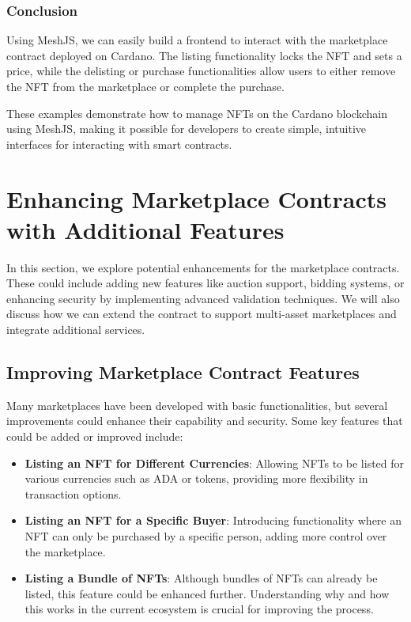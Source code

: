 \subsubsection{Conclusion}

Using MeshJS, we can easily build a frontend to interact with the marketplace contract deployed on Cardano. The listing functionality locks the NFT and sets a price, while the delisting or purchase functionalities allow users to either remove the NFT from the marketplace or complete the purchase.

These examples demonstrate how to manage NFTs on the Cardano blockchain using MeshJS, making it possible for developers to create simple, intuitive interfaces for interacting with smart contracts.


\section{Enhancing Marketplace Contracts with Additional Features}

In this section, we explore potential enhancements for the marketplace contracts. These could include adding new features like auction support, bidding systems, or enhancing security by implementing advanced validation techniques. We will also discuss how we can extend the contract to support multi-asset marketplaces and integrate additional services.

\subsection{Improving Marketplace Contract Features}

Many marketplaces have been developed with basic functionalities, but several improvements could enhance their capability and security. Some key features that could be added or improved include:

\begin{itemize}
    \item \textbf{Listing an NFT for Different Currencies}: Allowing NFTs to be listed for various currencies such as ADA or tokens, providing more flexibility in transaction options.
    \item \textbf{Listing an NFT for a Specific Buyer}: Introducing functionality where an NFT can only be purchased by a specific person, adding more control over the marketplace.
    \item \textbf{Listing a Bundle of NFTs}: Although bundles of NFTs can already be listed, this feature could be enhanced further. Understanding why and how this works in the current ecosystem is crucial for improving the process.
\end{itemize}

